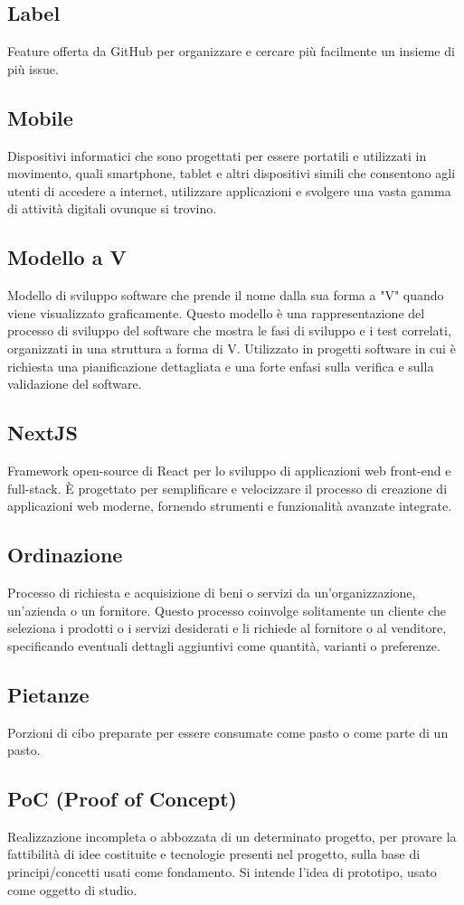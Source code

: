 \subsection{Label}Feature offerta da GitHub per organizzare e cercare più facilmente un insieme di più issue.
\subsection{Mobile}Dispositivi informatici che sono progettati per essere portatili e utilizzati in movimento, quali smartphone, tablet e altri dispositivi simili che consentono agli utenti di accedere a internet, utilizzare applicazioni e svolgere una vasta gamma di attività digitali ovunque si trovino.
\subsection{Modello a V}Modello di sviluppo software che prende il nome dalla sua forma a "V" quando viene visualizzato graficamente. Questo modello è una rappresentazione del processo di sviluppo del software che mostra le fasi di sviluppo e i test correlati, organizzati in una struttura a forma di V. Utilizzato in progetti software in cui è richiesta una pianificazione dettagliata e una forte enfasi sulla verifica e sulla validazione del software.
\subsection{NextJS}Framework open-source di React per lo sviluppo di applicazioni web front-end e full-stack. È progettato per semplificare e velocizzare il processo di creazione di applicazioni web moderne, fornendo strumenti e funzionalità avanzate integrate.
\subsection{Ordinazione}Processo di richiesta e acquisizione di beni o servizi da un'organizzazione, un'azienda o un fornitore. Questo processo coinvolge solitamente un cliente che seleziona i prodotti o i servizi desiderati e li richiede al fornitore o al venditore, specificando eventuali dettagli aggiuntivi come quantità, varianti o preferenze.
\subsection{Pietanze}Porzioni di cibo preparate per essere consumate come pasto o come parte di un pasto.
\subsection{PoC (Proof of Concept)}Realizzazione incompleta o abbozzata di un determinato progetto, per provare la fattibilità di idee costituite e tecnologie presenti nel progetto, sulla base di principi/concetti usati come fondamento. Si intende l’idea di prototipo, usato come oggetto di studio.

